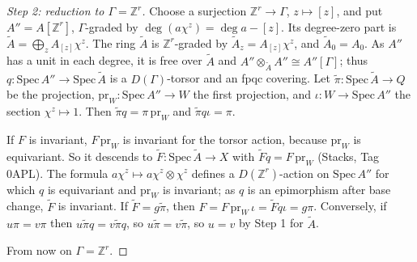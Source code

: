 \begin{proof}[Step 2: reduction to $\Gamma=\mathbb{Z}^r$]
Choose a surjection $\mathbb{Z}^r\to\Gamma$, $z\mapsto[z]$, and put $A''=A[\mathbb{Z}^r]$, $\Gamma$-graded by $\deg(a\chi^z)=\deg a-[z]$. Its degree-zero part is $\widetilde{A}=\bigoplus_{z}A_{[z]}\chi^z$. The ring $\widetilde{A}$ is $\mathbb{Z}^r$-graded by $\widetilde{A}_z=A_{[z]}\chi^z$, and $\widetilde{A}_0=A_0$. As $A''$ has a unit in each degree, it is free over $\widetilde{A}$ and $A''\otimes_{\widetilde{A}}A''\cong A''[\Gamma]$; thus $q\colon\mathrm{Spec}\,A''\to\mathrm{Spec}\,\widetilde{A}$ is a $D(\Gamma)$-torsor and an fpqc covering. Let $\widetilde{\pi}\colon\mathrm{Spec}\,\widetilde{A}\to Q$ be the projection, $\mathrm{pr}_W\colon\mathrm{Spec}\,A''\to W$ the first projection, and $\iota\colon W\to\mathrm{Spec}\,A''$ the section $\chi^z\mapsto1$. Then $\widetilde{\pi}q=\pi\,\mathrm{pr}_W$ and $\widetilde{\pi}q\iota=\pi$.

If $F$ is invariant, $F\,\mathrm{pr}_W$ is invariant for the torsor action, because $\mathrm{pr}_W$ is equivariant. So it descends to $\widetilde{F}\colon\mathrm{Spec}\,\widetilde{A}\to X$ with $\widetilde{F}q=F\,\mathrm{pr}_W$ (Stacks, Tag 0APL). The formula $a\chi^z\mapsto a\chi^z\otimes\chi^z$ defines a $D(\mathbb{Z}^r)$-action on $\mathrm{Spec}\,A''$ for which $q$ is equivariant and $\mathrm{pr}_W$ is invariant; as $q$ is an epimorphism after base change, $\widetilde{F}$ is invariant. If $\widetilde{F}=g\widetilde{\pi}$, then $F=F\,\mathrm{pr}_W\,\iota=\widetilde{F}q\iota=g\pi$. Conversely, if $u\pi=v\pi$ then $u\widetilde{\pi}q=v\widetilde{\pi}q$, so $u\widetilde{\pi}=v\widetilde{\pi}$, so $u=v$ by Step 1 for $\widetilde{A}$.

From now on $\Gamma=\mathbb{Z}^r$.
\end{proof}

